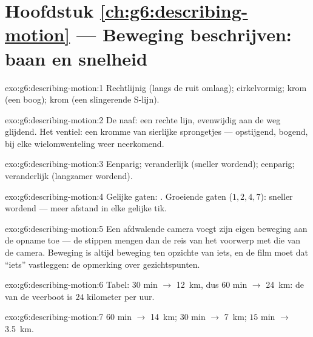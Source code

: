 \section*{Hoofdstuk \ref{ch:g6:describing-motion} --- Beweging beschrijven: baan en snelheid}

\begin{solution}{exo:g6:describing-motion:1}
Rechtlijnig (langs de ruit omlaag); cirkelvormig; krom (een boog);
krom (een slingerende S-lijn).
\end{solution}

\begin{solution}{exo:g6:describing-motion:2}
De naaf: een rechte lijn, evenwijdig aan de weg glijdend. Het ventiel:
een kromme van sierlijke sprongetjes --- opstijgend, bogend, bij elke
wielomwenteling weer neerkomend.
\end{solution}

\begin{solution}{exo:g6:describing-motion:3}
Eenparig; veranderlijk (sneller wordend); eenparig; veranderlijk
(langzamer wordend).
\end{solution}

\begin{solution}{exo:g6:describing-motion:4}
Gelijke gaten: . Groeiende gaten ($1, 2, 4, 7$):
sneller wordend --- meer afstand in elke gelijke tik.
\end{solution}

\begin{solution}{exo:g6:describing-motion:5}
Een afdwalende camera voegt zijn eigen beweging aan de opname toe ---
de stippen mengen dan de reis van het voorwerp met die van de camera.
Beweging is altijd beweging ten opzichte van iets, en de film moet dat
``iets'' vastleggen: de opmerking over gezichtspunten.
\end{solution}

\begin{solution}{exo:g6:describing-motion:6}
Tabel: $30$ min $\to$ \qty{12}{km}, dus $60$ min $\to$ \qty{24}{km}:
de  van de veerboot is $24$ kilometer per uur.
\end{solution}

\begin{solution}{exo:g6:describing-motion:7}
$60$ min $\to$ \qty{14}{km}; $30$ min $\to$ \qty{7}{km}; $15$ min
$\to$ \qty{3.5}{km}.
\end{solution}

